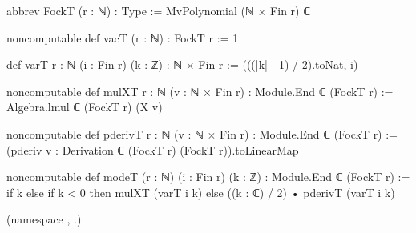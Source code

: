 \begin{leancode}
abbrev FockT (r : ℕ) : Type := MvPolynomial (ℕ × Fin r) ℂ
\end{leancode}
\begin{leancode}
noncomputable def vacT (r : ℕ) : FockT r := 1
\end{leancode}
\begin{leancode}
def varT {r : ℕ} (i : Fin r) (k : ℤ) : ℕ × Fin r := (((|k| - 1) / 2).toNat, i)
\end{leancode}
\begin{leancode}
noncomputable def mulXT {r : ℕ} (v : ℕ × Fin r) : Module.End ℂ (FockT r) :=
  Algebra.lmul ℂ (FockT r) (X v)
\end{leancode}
\begin{leancode}
noncomputable def pderivT {r : ℕ} (v : ℕ × Fin r) : Module.End ℂ (FockT r) :=
  (pderiv v : Derivation ℂ (FockT r) (FockT r)).toLinearMap
\end{leancode}
\begin{leancode}
noncomputable def modeT (r : ℕ) (i : Fin r) (k : ℤ) : Module.End ℂ (FockT r) :=
  if k %
  else if k < 0 then mulXT (varT i k)
  else ((k : ℂ) / 2) • pderivT (varT i k)
\end{leancode}
(namespace , .)

